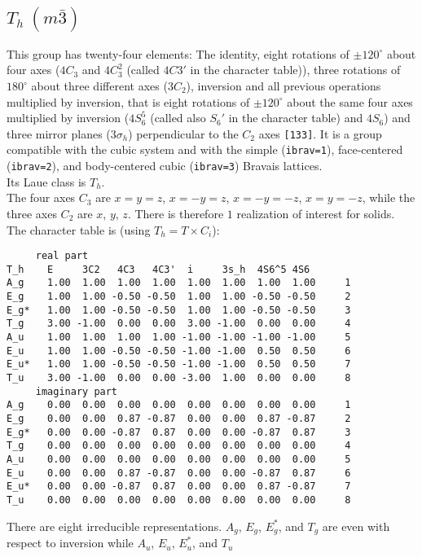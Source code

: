 \documentclass[12pt,a4paper]{article}
\begin{document}
\subsection{\color{web-blue}$T_h\ (m\bar 3)$}
This group has twenty-four elements: The identity, eight rotations 
of $\pm120^\circ$ about four axes ($4C_3$ and $4C_3^2$ (called $4C3'$ in the 
character table)), three rotations of $180^\circ$ about three different axes 
($3C_2$), inversion and all previous operations multiplied by inversion, that is
eight rotations of $\pm120^\circ$ about the same four axes multiplied by inversion
($4S_6^5$ (called also $S_6'$ in the character table) and $4S_6$) and three 
mirror planes ($3\sigma_h$) perpendicular to the $C_2$ axes \texttt{[133]}.
It is a group compatible with the cubic system and with the  
simple (\texttt{ibrav=1}), face-centered (\texttt{ibrav=2}), 
and body-centered cubic (\texttt{ibrav=3}) Bravais lattices. \\
Its Laue class is $T_{h}$. \\
The four axes $C_3$ are $x=y=z$, $x=-y=z$, $x=-y=-z$, $x=y=-z$, while
the three axes $C_2$ are $x$, $y$, $z$. There is therefore $1$
realization of interest for solids. \\
The character table is (using $T_h= T \times C_i$):
\begin{verbatim}
     real part
T_h    E     3C2   4C3   4C3'  i     3s_h  4S6^5 4S6  
A_g    1.00  1.00  1.00  1.00  1.00  1.00  1.00  1.00     1
E_g    1.00  1.00 -0.50 -0.50  1.00  1.00 -0.50 -0.50     2
E_g*   1.00  1.00 -0.50 -0.50  1.00  1.00 -0.50 -0.50     3
T_g    3.00 -1.00  0.00  0.00  3.00 -1.00  0.00  0.00     4
A_u    1.00  1.00  1.00  1.00 -1.00 -1.00 -1.00 -1.00     5
E_u    1.00  1.00 -0.50 -0.50 -1.00 -1.00  0.50  0.50     6
E_u*   1.00  1.00 -0.50 -0.50 -1.00 -1.00  0.50  0.50     7
T_u    3.00 -1.00  0.00  0.00 -3.00  1.00  0.00  0.00     8
     imaginary part
A_g    0.00  0.00  0.00  0.00  0.00  0.00  0.00  0.00     1
E_g    0.00  0.00  0.87 -0.87  0.00  0.00  0.87 -0.87     2
E_g*   0.00  0.00 -0.87  0.87  0.00  0.00 -0.87  0.87     3
T_g    0.00  0.00  0.00  0.00  0.00  0.00  0.00  0.00     4
A_u    0.00  0.00  0.00  0.00  0.00  0.00  0.00  0.00     5
E_u    0.00  0.00  0.87 -0.87  0.00  0.00 -0.87  0.87     6
E_u*   0.00  0.00 -0.87  0.87  0.00  0.00  0.87 -0.87     7
T_u    0.00  0.00  0.00  0.00  0.00  0.00  0.00  0.00     8
\end{verbatim}
There are eight irreducible representations. $A_g$, $E_g$, $E_g^*$, and $T_g$
are even with respect to inversion while $A_u$, $E_u$, $E_u^*$, and $T_u$
\end{document}
